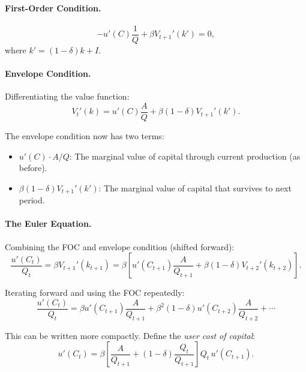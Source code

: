 \paragraph{First-Order Condition.}
\begin{equation}
-u'(C) \frac{1}{Q} + \beta V_{t+1}'(k') = 0,
\label{eq:ac-dep-foc-bellman}
\end{equation}
where $k' = (1-\delta)k + I$.

\paragraph{Envelope Condition.}
Differentiating the value function:
\begin{equation}
V_t'(k) = u'(C) \frac{A}{Q} + \beta (1-\delta) V_{t+1}'(k').
\label{eq:ac-dep-envelope}
\end{equation}

The envelope condition now has two terms:
\begin{itemize}[nosep]
\item $u'(C) \cdot A/Q$: The marginal value of capital through current production (as before).
\item $\beta (1-\delta) V_{t+1}'(k')$: The marginal value of capital that survives to next period.
\end{itemize}

\paragraph{The Euler Equation.}
Combining the FOC and envelope condition (shifted forward):
\begin{equation}
\frac{u'(C_t)}{Q_t} = \beta V_{t+1}'(k_{t+1}) = \beta \left[ u'(C_{t+1}) \frac{A}{Q_{t+1}} + \beta (1-\delta) V_{t+2}'(k_{t+2}) \right].
\label{eq:ac-dep-euler-step}
\end{equation}

Iterating forward and using the FOC repeatedly:
\begin{equation}
\frac{u'(C_t)}{Q_t} = \beta u'(C_{t+1}) \frac{A}{Q_{t+1}} + \beta^2 (1-\delta) u'(C_{t+2}) \frac{A}{Q_{t+2}} + \cdots
\label{eq:ac-dep-euler-iterated}
\end{equation}

This can be written more compactly. Define the \emph{user cost of capital}:
\begin{equation}
\boxed{u'(C_t) = \beta \left[ \frac{A}{Q_{t+1}} + (1-\delta) \frac{Q_t}{Q_{t+1}} \right] Q_t \, u'(C_{t+1}).}
\label{eq:ac-dep-euler-full}
\end{equation}

